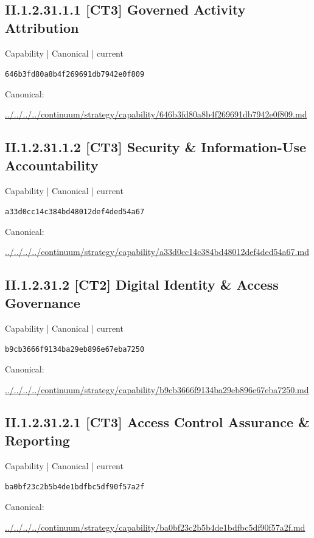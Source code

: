 \documentclass[10pt,a4paper]{article}
\begin{document}
\subsection*{II.1.2.31.1.1 [CT3] Governed Activity Attribution}
{\small Capability | Canonical | current}\par
\texttt{646b3fd80a8b4f269691db7942e0f809}\par
Canonical: \par
{\footnotesize\url{../../../../continuum/strategy/capability/646b3fd80a8b4f269691db7942e0f809.md}}\par
\subsection*{II.1.2.31.1.2 [CT3] Security \& Information-Use Accountability}
{\small Capability | Canonical | current}\par
\texttt{a33d0cc14c384bd48012def4ded54a67}\par
Canonical: \par
{\footnotesize\url{../../../../continuum/strategy/capability/a33d0cc14c384bd48012def4ded54a67.md}}\par
\subsection*{II.1.2.31.2 [CT2] Digital Identity \& Access Governance}
{\small Capability | Canonical | current}\par
\texttt{b9cb3666f9134ba29eb896e67eba7250}\par
Canonical: \par
{\footnotesize\url{../../../../continuum/strategy/capability/b9cb3666f9134ba29eb896e67eba7250.md}}\par
\subsection*{II.1.2.31.2.1 [CT3] Access Control Assurance \& Reporting}
{\small Capability | Canonical | current}\par
\texttt{ba0bf23c2b5b4de1bdfbc5df90f57a2f}\par
Canonical: \par
{\footnotesize\url{../../../../continuum/strategy/capability/ba0bf23c2b5b4de1bdfbc5df90f57a2f.md}}\par
\end{document}
